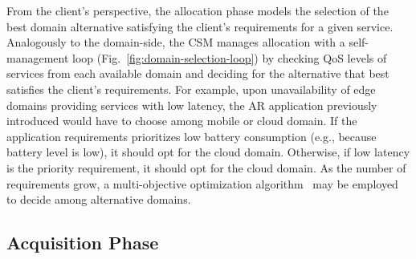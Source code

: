 From the client's perspective, the allocation phase models the selection of the best domain alternative satisfying the client's requirements for a given service. 
Analogously to the domain-side, the CSM manages allocation with a self-management loop (Fig.~\ref{fig:domain-selection-loop}) by checking QoS levels of services from each available domain and deciding for the alternative that best satisfies the client's requirements. 
For example, upon unavailability of edge domains providing services with low latency, the AR application previously introduced would have to choose among mobile or cloud domain. If the application requirements prioritizes low battery consumption (e.g., because battery level is low), it should opt for the cloud domain. Otherwise, if low latency is the priority requirement, it should opt for the cloud domain. As the number of requirements grow, a multi-objective optimization algorithm~\cite{Olson1996} may be employed to decide among alternative domains.






\subsection*{Acquisition Phase}\label{sec:A3-E-acquisition}



